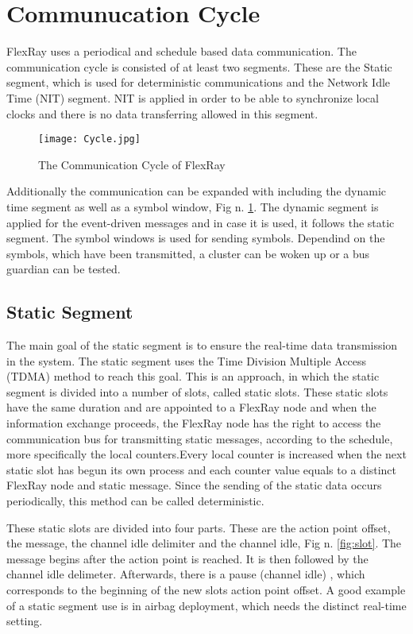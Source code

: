 \documentclass[conference]{IEEEtran}
\begin{document}
\section{Communucation Cycle}
FlexRay uses a periodical and schedule based data communication. The communication cycle is consisted of at least two segments. These are the Static segment, which is used for deterministic communications and the Network Idle Time (NIT) segment. NIT is applied in order to be able to synchronize local clocks and there is no data transferring allowed in this segment.

\begin{figure}[htbp]
\texttt{[image: Cycle.jpg]}
  \caption{The Communication Cycle of FlexRay}
  \label{fig:cycle}
\end{figure}

Additionally the communication can be expanded with including the dynamic time segment as well as a symbol window, Fig n. \ref{fig:cycle}. The dynamic segment is applied for the event-driven messages and in case it is used, it follows the static segment. The symbol windows is used for sending symbols. Dependind on the symbols, which have been transmitted, a cluster can be woken up or a bus guardian can be tested.


\subsection{Static Segment}
The main goal of the static segment is to ensure the real-time data transmission in the system. The static segment uses the Time Division Multiple Access (TDMA) method to reach this goal. This is an approach, in which the static segment is divided into a number of slots, called static slots. These static slots have the same duration and are appointed to a FlexRay node and when the information exchange proceeds, the FlexRay node has the right to access the communication bus for transmitting static messages, according to the schedule, more specifically the local counters.Every local counter is increased when the next static slot has begun its own process and each counter value equals to a distinct FlexRay node and static message. Since the sending of the static data occurs periodically, this method can be called deterministic.

These static slots are divided into four parts. These are the action point offset, the message, the channel idle delimiter and the channel idle, Fig n. \ref{fig:slot}. The message begins after the action point is reached. It is then followed by the channel idle delimeter. Afterwards, there is a pause (channel idle) , which corresponds to the beginning of the new slots action point offset. A good example of a static segment use is in airbag deployment, which needs the distinct real-time setting.
\end{document}
